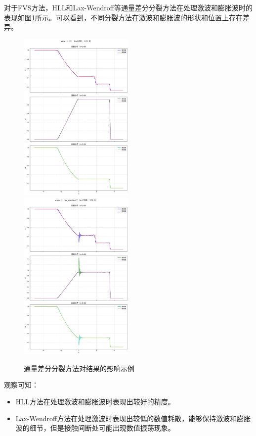 \documentclass[UTF8]{ctexart}
\begin{document}
对于FVS方法，HLL和Lax-Wendroff等通量差分分裂方法在处理激波和膨胀波时的表现如图\ref{fig:flux_diff_effect}所示。可以看到，不同分裂方法在激波和膨胀波的形状和位置上存在差异。
\begin{figure}
    \includegraphics[width=0.5\textwidth]{hll.png}
    \includegraphics[width=0.5\textwidth]{lax_wendroff.png}
    \caption{通量差分分裂方法对结果的影响示例}
    \label{fig:flux_diff_effect}
\end{figure}
观察可知：
\begin{itemize}
    \item HLL方法在处理激波和膨胀波时表现出较好的精度。
    \item Lax-Wendroff方法在处理激波时表现出较低的数值耗散，能够保持激波和膨胀波的细节，但是接触间断处可能出现数值振荡现象。
\end{itemize}
\end{document}
